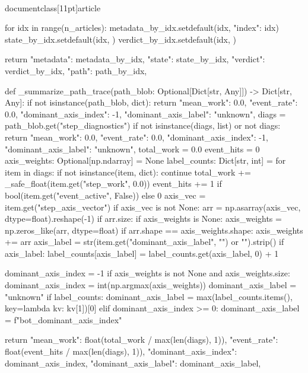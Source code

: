 \\documentclass[11pt]{article}
\begin{document}
\begin{CodeBlock}
    for idx in range(n_articles):
        metadata_by_idx.setdefault(idx, {"index": idx})
        state_by_idx.setdefault(idx, {})
        verdict_by_idx.setdefault(idx, {})

    return {
        "metadata": metadata_by_idx,
        "state": state_by_idx,
        "verdict": verdict_by_idx,
        "path": path_by_idx,
    }


def _summarize_path_trace(path_blob: Optional[Dict[str, Any]]) -> Dict[str, Any]:
    if not isinstance(path_blob, dict):
        return {
            "mean_work": 0.0,
            "event_rate": 0.0,
            "dominant_axis_index": -1,
            "dominant_axis_label": "unknown",
        }
    diags = path_blob.get("step_diagnostics")
    if not isinstance(diags, list) or not diags:
        return {
            "mean_work": 0.0,
            "event_rate": 0.0,
            "dominant_axis_index": -1,
            "dominant_axis_label": "unknown",
        }
    total_work = 0.0
    event_hits = 0
    axis_weights: Optional[np.ndarray] = None
    label_counts: Dict[str, int] = {}
    for item in diags:
        if not isinstance(item, dict):
            continue
        total_work += _safe_float(item.get("step_work", 0.0))
        event_hits += 1 if bool(item.get("event_active", False)) else 0
        axis_vec = item.get("step_axis_vector")
        if axis_vec is not None:
            arr = np.asarray(axis_vec, dtype=float).reshape(-1)
            if arr.size:
                if axis_weights is None:
                    axis_weights = np.zeros_like(arr, dtype=float)
                if arr.shape == axis_weights.shape:
                    axis_weights += arr
        axis_label = str(item.get("dominant_axis_label", "") or "").strip()
        if axis_label:
            label_counts[axis_label] = label_counts.get(axis_label, 0) + 1

    dominant_axis_index = -1
    if axis_weights is not None and axis_weights.size:
        dominant_axis_index = int(np.argmax(axis_weights))
    dominant_axis_label = "unknown"
    if label_counts:
        dominant_axis_label = max(label_counts.items(), key=lambda kv: kv[1])[0]
    elif dominant_axis_index >= 0:
        dominant_axis_label = f"bot_{dominant_axis_index}"

    return {
        "mean_work": float(total_work / max(len(diags), 1)),
        "event_rate": float(event_hits / max(len(diags), 1)),
        "dominant_axis_index": dominant_axis_index,
        "dominant_axis_label": dominant_axis_label,
    }



\end{CodeBlock}
\end{document}
